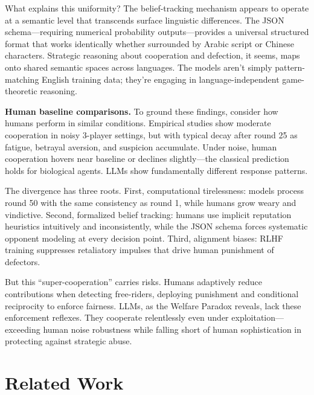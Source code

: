 \documentclass{uai2026} %
\begin{document}
What explains this uniformity? The belief-tracking mechanism appears to operate at a semantic level that transcends surface linguistic differences. The JSON schema---requiring numerical probability outputs---provides a universal structured format that works identically whether surrounded by Arabic script or Chinese characters. Strategic reasoning about cooperation and defection, it seems, maps onto shared semantic spaces across languages. The models aren't simply pattern-matching English training data; they're engaging in language-independent game-theoretic reasoning.

\textbf{Human baseline comparisons.} To ground these findings, consider how humans perform in similar conditions. Empirical studies show moderate cooperation in noisy 3-player settings, but with typical decay after round 25 as fatigue, betrayal aversion, and suspicion accumulate. Under noise, human cooperation hovers near baseline or declines slightly---the classical prediction holds for biological agents. LLMs show fundamentally different response patterns.

The divergence has three roots. First, computational tirelessness: models process round 50 with the same consistency as round 1, while humans grow weary and vindictive. Second, formalized belief tracking: humans use implicit reputation heuristics intuitively and inconsistently, while the JSON schema forces systematic opponent modeling at every decision point. Third, alignment biases: RLHF training suppresses retaliatory impulses that drive human punishment of defectors.

But this ``super-cooperation'' carries risks. Humans adaptively reduce contributions when detecting free-riders, deploying punishment and conditional reciprocity to enforce fairness. LLMs, as the Welfare Paradox reveals, lack these enforcement reflexes. They cooperate relentlessly even under exploitation---exceeding human noise robustness while falling short of human sophistication in protecting against strategic abuse.

\section{Related Work}\label{sec:related}
\end{document}
